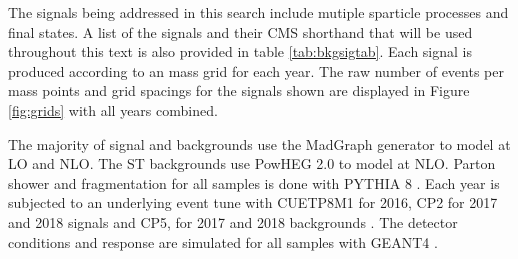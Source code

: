 The signals being addressed in this search include mutiple sparticle processes and final states. A list of the signals and their CMS shorthand that will be used throughout this text is also provided in table \ref{tab:bkgsigtab}. Each signal is produced according to an mass grid for each year.  The raw number of events per mass points and grid spacings for the signals shown are displayed in Figure \ref{fig:grids} with all years combined. 


The majority of signal and backgrounds use the MadGraph \cite{Alwall:2011uj} generator to model at LO and NLO. The ST backgrounds use PowHEG 2.0 \cite{Alioli:2010xd} to model at NLO. Parton shower and fragmentation for all samples is done with PYTHIA 8 \cite{Sjostrand:2014zea}. Each year is subjected to an underlying event tune with CUETP8M1 for 2016, CP2 for 2017 and 2018 signals and CP5, for 2017 and 2018 backgrounds \cite{CMS:2015wcf}\cite{CMS:2019csb}. The detector conditions and response are simulated for all samples with GEANT4 \cite{GEANT4:2002zbu}.

